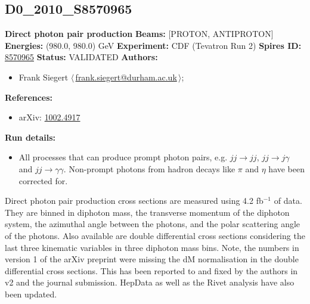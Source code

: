 \subsection[D0\_2010\_S8570965]{D0\_2010\_S8570965\,\cite{Abazov:2010ah}}
\textbf{Direct photon pair production}\newline
\textbf{Beams:} [PROTON, ANTIPROTON] \newline
\textbf{Energies:} (980.0, 980.0) GeV \newline
\textbf{Experiment:} CDF (Tevatron Run 2) \newline
\textbf{Spires ID:} \href{http://www.slac.stanford.edu/spires/find/hep/www?rawcmd=key+8570965}{8570965}\newline
\textbf{Status:} VALIDATED\newline
\textbf{Authors:}
\begin{itemize}
  \item Frank Siegert $\langle\,$\href{mailto:frank.siegert@durham.ac.uk}{frank.siegert@durham.ac.uk}$\,\rangle$;
\end{itemize}
\textbf{References:}
\begin{itemize}
  \item arXiv: \href{http://arxiv.org/abs/1002.4917}{1002.4917}
\end{itemize}
\textbf{Run details:}
\begin{itemize}

  \item All processes that can produce prompt photon pairs, e.g. $jj \to jj$, $jj \to j\gamma$ and $jj \to \gamma \gamma$. Non-prompt photons from hadron decays like $\pi$ and $\eta$ have been corrected for.\end{itemize}

\noindent Direct photon pair production cross sections are measured using 4.2 fb$^{-1}$ of data. They are binned in diphoton mass, the transverse momentum of the diphoton system, the azimuthal angle between the photons, and the polar scattering angle of the photons. Also available are double differential cross sections considering the last three kinematic variables in three diphoton mass bins. Note, the numbers in version 1 of the arXiv preprint were missing the dM normalisation in the double differential cross sections. This has been reported to and fixed by the authors in v2 and the journal submission. HepData as well as the Rivet analysis have also been updated.

\clearpage



